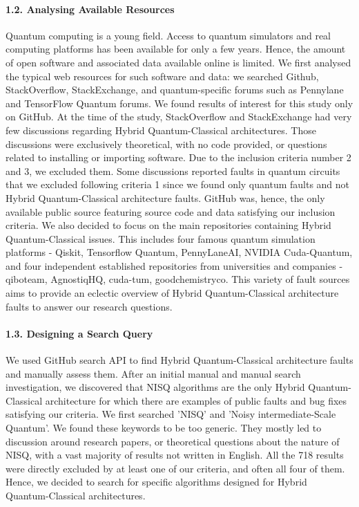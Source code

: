 \paragraph*{1.2. Analysing Available Resources} 
Quantum computing is a young field. Access to quantum simulators and real computing platforms has been available for only a few years.  Hence, the amount of open software and associated data available online is limited. We first analysed the typical web resources for such software and data: we searched Github, StackOverflow, StackExchange, and quantum-specific forums such as Pennylane and TensorFlow Quantum forums. We found results of interest for this study only on GitHub. At the time of the study, StackOverflow and StackExchange had very few discussions regarding Hybrid Quantum-Classical architectures. Those discussions were exclusively theoretical, with no code provided, or questions related to installing or importing software. Due to the inclusion criteria number 2 and 3, we excluded them. Some discussions reported faults in quantum circuits that we excluded following criteria 1 since we found only quantum faults and not Hybrid Quantum-Classical architecture faults. GitHub was, hence, the only available public source featuring source code and data satisfying our inclusion criteria. We also decided to focus on the main repositories containing Hybrid Quantum-Classical issues. This includes four famous quantum simulation platforms - Qiskit, Tensorflow Quantum, PennyLaneAI, NVIDIA Cuda-Quantum, and four independent established repositories from universities and companies - qiboteam, AgnostiqHQ, cuda-tum, goodchemistryco. This variety of fault sources aims to provide an eclectic overview of Hybrid Quantum-Classical architecture faults to answer our research questions. \\

\paragraph*{1.3. Designing a Search Query} 
We used GitHub search API to find Hybrid Quantum-Classical architecture faults and manually assess them. After an initial manual and manual search investigation, we discovered that NISQ algorithms are the only Hybrid Quantum-Classical architecture for which there are examples of public faults and bug fixes satisfying our criteria. We first searched 'NISQ' and 'Noisy intermediate-Scale Quantum'. We found these keywords to be too generic. They mostly led to discussion around research papers, or theoretical questions about the nature of NISQ, with a vast majority of results not written in English. All the 718 results were directly excluded by at least one of our criteria, and often all four of them. Hence, we decided to search for specific algorithms designed for Hybrid Quantum-Classical architectures. 

